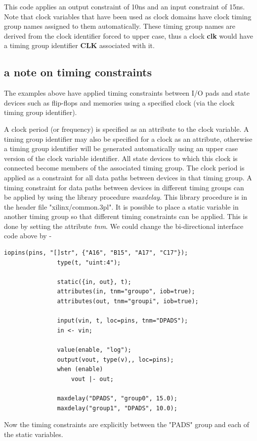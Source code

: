             This code applies an output constraint of 10ns and an input constraint
            of 15ns. Note that clock variables that have been used as clock domains
            have clock timing group names assigned to them automatically. These
            timing group names are derived from the clock identifier forced to
            upper case, thus a clock {\bf clk} would have a timing group identifier
            {\bf CLK} associated with it.

        \subsection{a note on timing constraints}

            The examples above have applied timing constraints between I/O
            pads and state devices such as flip-flops and memories using a
            specified clock (via the clock timing group identifier).
            
            A clock period (or frequency) is specified as an attribute to the clock
            variable. A timing group identifier may also be specified for a clock
            as an attribute, otherwise a timing group identifier will be generated
            automatically using an upper case version of the clock variable
            identifier. All state devices to which this clock is connected become
            members of the associated timing group. The clock period is applied as
            a constraint for all data paths between devices in that timing group. A
            timing constraint for data paths between devices in different timing
            groups can be applied by using the library procedure {\em maxdelay}.
            This library procedure is in the header file "xilinx/common.3pl".
            It is possible to place a static variable in another timing group so
            that different timing constraints can be applied. This is done by
            setting the attribute {\em tnm}. We could change the
            bi-directional interface code above by -
            \begin{lstlisting}[gobble=12, language=threepl]
               iopins(pins, "[]str", {"A16", "B15", "A17", "C17"});
               type(t, "uint:4");

               static({in, out}, t);
               attributes(in, tnm="groupo", iob=true);
               attributes(out, tnm="groupi", iob=true);

               input(vin, t, loc=pins, tnm="DPADS");
               in <- vin;

               value(enable, "log");
               output(vout, type(v),, loc=pins);
               when (enable)
                   vout |- out;

               maxdelay("DPADS", "group0", 15.0);
               maxdelay("group1", "DPADS", 10.0);
            \end{lstlisting}
            Now the timing constraints are explicitly between the "PADS" group
            and each of the static variables.

